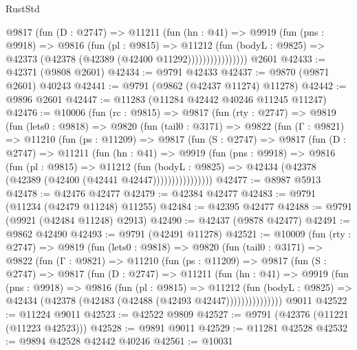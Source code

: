\begin{lexlean}{RustStd}
\begin{coremodule}
                  @9817
                    (fun (D : @2747) =>
                    @11211
                      (fun (hn : @41) =>
                      @9919
                        (fun (pns : @9918) =>
                        @9816
                          (fun (pl : @9815) =>
                          @11212
                            (fun (bodyL : @9825) =>
                            @42373 (@42378 (@42389 (@42400 @11292))))))))))))))))
    @2601
@42433 := @42371 (@9808 @2601)
@42434 := @9791 @42433
@42437 := @9870 (@9871 @2601) @40243
@42441 := @9791 (@9862 (@42437 @11274) @11278)
@42442 := @9896 @2601
@42447 := @11283 (@11284 @42442 @40246 @11245 @11247)
@42476 := @10006
    (fun (rc : @9815) =>
    @9817
      (fun (rty : @2747) =>
      @9819
        (fun (lets0 : @9818) =>
        @9820
          (fun (tail0 : @3171) =>
          @9822
            (fun (Γ : @9821) =>
            @11210
              (fun (ps : @11209) =>
              @9817
                (fun (S : @2747) =>
                @9817
                  (fun (D : @2747) =>
                  @11211
                    (fun (hn : @41) =>
                    @9919
                      (fun (pns : @9918) =>
                      @9816
                        (fun (pl : @9815) =>
                        @11212
                          (fun (bodyL : @9825) =>
                          @42434 (@42378 (@42389 (@42400 (@42441 @42447))))))))))))))))
@42477 := @8987 @5913
@42478 := @42476 @42477
@42479 := @42384 @42477
@42483 := @9791 (@11234 (@42479 @11248) @11255)
@42484 := @42395 @42477
@42488 := @9791 (@9921 (@42484 @11248) @2913)
@42490 := @42437 (@9878 @42477)
@42491 := @9862 @42490
@42493 := @9791 (@42491 @11278)
@42521 := @10009
    (fun (rty : @2747) =>
    @9819
      (fun (lets0 : @9818) =>
      @9820
        (fun (tail0 : @3171) =>
        @9822
          (fun (Γ : @9821) =>
          @11210
            (fun (ps : @11209) =>
            @9817
              (fun (S : @2747) =>
              @9817
                (fun (D : @2747) =>
                @11211
                  (fun (hn : @41) =>
                  @9919
                    (fun (pns : @9918) =>
                    @9816
                      (fun (pl : @9815) =>
                      @11212
                        (fun (bodyL : @9825) =>
                        @42434 (@42378 (@42483 (@42488 (@42493 @42447)))))))))))))))
    @9011
@42522 := @11224 @9011
@42523 := @42522 @9809
@42527 := @9791 (@42376 (@11221 (@11223 @42523)))
@42528 := @9891 @9011
@42529 := @11281 @42528
@42532 := @9894 @42528 @42442 @40246
@42561 := @10031

\end{coremodule}
\end{lexlean}
